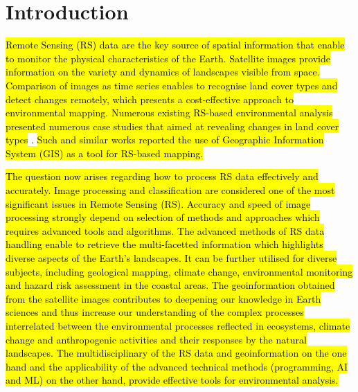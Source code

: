 \documentclass[final,5p,times,twocolumn]{elsarticle}
\begin{document}
\section{Introduction}

\hl{Remote Sensing (RS) data are the key source of spatial information that enable to monitor the physical characteristics of the Earth. Satellite images provide information on the variety and dynamics of landscapes visible from space. Comparison of images as time series enables to recognise land cover types and detect changes remotely, which presents a cost-effective approach to environmental mapping. Numerous existing RS-based environmental analysis presented numerous case studies that aimed at revealing changes in land cover types} \cite{geosciences12100357,976724,Lemenkova202211,6723424}. \hl{Such and similar works reported the use of Geographic Information System (GIS) as a tool for RS-based mapping. }

\hl{The question now arises regarding how to process RS data effectively and accurately. Image processing and classification are considered one of the most significant issues in Remote Sensing (RS). Accuracy and speed of image processing strongly depend on selection of methods and approaches which requires advanced tools and algorithms. The advanced methods of RS data handling enable to retrieve the multi-facetted information which highlights diverse aspects of the Earth's landscapes. It can be further utilised for diverse subjects, including geological mapping, climate change, environmental monitoring and hazard risk assessment in the coastal areas. The geoinformation obtained from the satellite images contributes to deepening our knowledge in Earth sciences and thus increase our understanding of the complex processes interrelated between the environmental processes reflected in ecosystems, climate change and anthropogenic activities and their responses by the natural landscapes. The multidisciplinary of the RS data and geoinformation on the one hand and the applicability of the advanced technical methods (programming, AI and ML) on the other hand, provide effective tools for environmental analysis.} 
\end{document}
